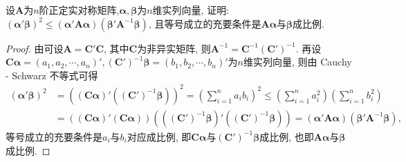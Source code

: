 \documentclass[../../main.tex]{subfiles}%
\begin{document}
\begin{example}
设$\boldsymbol{A}$为$n$阶正定实对称矩阵,$\boldsymbol{\alpha}, \boldsymbol{\beta}$为$n$维实列向量, 证明: $(\boldsymbol{\alpha}'\boldsymbol{\beta})^2\leqslant  (\boldsymbol{\alpha}'\boldsymbol{A}\boldsymbol{\alpha})(\boldsymbol{\beta}'\boldsymbol{A}^{-1}\boldsymbol{\beta})$, 且等号成立的充要条件是$\boldsymbol{A}\boldsymbol{\alpha}$与$\boldsymbol{\beta}$成比例.
\end{example}
\begin{proof}

由可设$\boldsymbol{A}=\boldsymbol{C}'\boldsymbol{C}$, 其中$\boldsymbol{C}$为非异实矩阵, 则$\boldsymbol{A}^{-1}=\boldsymbol{C}^{-1}(\boldsymbol{C}')^{-1}$. 再设$\boldsymbol{C}\boldsymbol{\alpha}=(a_1, a_2, \cdots, a_n)', (\boldsymbol{C}')^{-1}\boldsymbol{\beta}=(b_1, b_2, \cdots, b_n)'$为$n$维实列向量, 则由 Cauchy - Schwarz 不等式可得
\begin{align*}
(\boldsymbol{\alpha}'\boldsymbol{\beta})^2 
&= ((\boldsymbol{C}\boldsymbol{\alpha})'((\boldsymbol{C}')^{-1}\boldsymbol{\beta}))^2 = \left(\sum_{i = 1}^n a_ib_i\right)^2\leqslant  \left(\sum_{i = 1}^n a_i^2\right)\left(\sum_{i = 1}^n b_i^2\right)\\
&= ((\boldsymbol{C}\boldsymbol{\alpha})'(\boldsymbol{C}\boldsymbol{\alpha}))((( \boldsymbol{C}')^{-1}\boldsymbol{\beta})'((\boldsymbol{C}')^{-1}\boldsymbol{\beta})) = (\boldsymbol{\alpha}'\boldsymbol{A}\boldsymbol{\alpha})(\boldsymbol{\beta}'\boldsymbol{A}^{-1}\boldsymbol{\beta}),
\end{align*}
等号成立的充要条件是$a_i$与$b_i$对应成比例, 即$\boldsymbol{C}\boldsymbol{\alpha}$与$(\boldsymbol{C}')^{-1}\boldsymbol{\beta}$成比例, 也即$\boldsymbol{A}\boldsymbol{\alpha}$与$\boldsymbol{\beta}$成比例. 

\end{proof}
\end{document}
